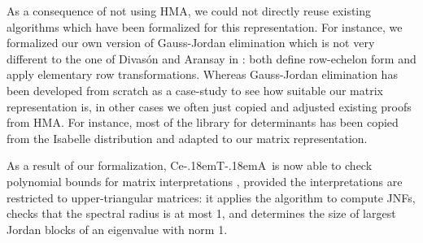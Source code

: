 \documentclass[11pt,a4paper]{article}
\newcommand\ceta{\textsf{Ce\kern-.18emT\kern-.18emA}}
\begin{document}
As a consequence of not using HMA, we could not directly reuse existing 
algorithms which
have been formalized for this representation. For instance, we formalized our
own version of Gauss-Jordan elimination which is not very different to the
one of Divas\'on and Aransay in \cite{Gauss_Jordan-AFP}: both define row-echelon
form and apply elementary row transformations. Whereas Gauss-Jordan elimination
has been developed from scratch as a case-study to see how suitable our matrix
representation is, in other cases we often just
copied and adjusted existing proofs from HMA. For instance, most of the library for 
determinants has been copied from the Isabelle distribution and adapted to our
matrix representation.


As a result of our formalization, \ceta\ is now able to check  
polynomial bounds for matrix interpretations \cite{MatrixJAR}, provided
the interpretations are restricted to upper-triangular matrices: 
it applies the algorithm
to compute JNFs, checks that the spectral radius is at most 1, 
and determines the size of largest Jordan blocks of an eigenvalue with norm 1.










\end{document}
